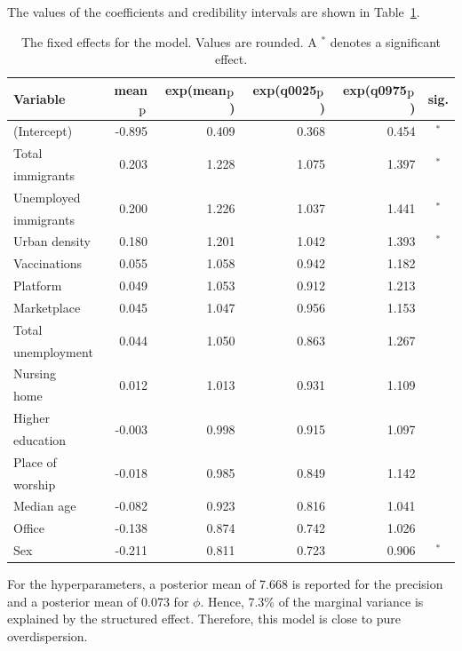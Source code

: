 \clearpage
The values of the coefficients and credibility intervals are shown in Table~\ref{fixedAllNorway_spatial}.
\begin{table}[H]
\caption{The fixed effects for the model. Values are rounded. A $^*$ denotes a significant effect. \label{fixedAllNorway_spatial}}
\begin{tabular}{l r r r r c}
\toprule
\textbf{Variable}	& \textbf{mean$_{\hbox{p}}$}	& \textbf{exp(mean$_{\hbox{p}}$)} & \textbf{exp(q0025$_{\hbox{p}}$)} & \textbf{exp(q0975$_{\hbox{p}}$)} & \textbf{sig.}\\
\midrule
(Intercept) & -0.895 & 0.409 & 0.368 & 0.454 & $^*$ \\
Total & \multirow{2}{*}{0.203}& \multirow{2}{*}{1.228}& \multirow{2}{*}{1.075}& \multirow{2}{*}{1.397}& \multirow{2}{*}{$^*$}\\
immigrants \\
Unemployed & \multirow{2}{*}{0.200} & \multirow{2}{*}{1.226} & \multirow{2}{*}{1.037} & \multirow{2}{*}{1.441} & \multirow{2}{*}{$^*$} \\
immigrants\\
Urban density & 0.180 & 1.201 & 1.042 & 1.393 & $^*$ \\
Vaccinations & 0.055 & 1.058 & 0.942 & 1.182\\
Platform & 0.049 & 1.053 & 0.912 & 1.213\\
Marketplace & 0.045 & 1.047 & 0.956 & 1.153 \\
Total & \multirow{2}{*}{0.044}& \multirow{2}{*}{1.050}& \multirow{2}{*}{0.863}& \multirow{2}{*}{1.267}\\
unemployment \\
Nursing & \multirow{2}{*}{0.012} & \multirow{2}{*}{1.013} & \multirow{2}{*}{0.931} & \multirow{2}{*}{1.109} \\
home\\
Higher & \multirow{2}{*}{-0.003}& \multirow{2}{*}{0.998}& \multirow{2}{*}{0.915}& \multirow{2}{*}{1.097}\\ 
education \\
Place of & \multirow{2}{*}{-0.018}& \multirow{2}{*}{0.985}& \multirow{2}{*}{0.849}& \multirow{2}{*}{1.142} \\
worship \\
Median age& -0.082 & 0.923 & 0.816 & 1.041 \\
Office & -0.138 & 0.874 & 0.742 & 1.026 \\
Sex & -0.211 & 0.811 & 0.723 & 0.906 & $^*$ \\
\bottomrule
\end{tabular}
\end{table}
For the hyperparameters, a posterior mean of 7.668 is reported for the precision and a posterior mean of 0.073 for $\phi$. Hence, 7.3\% of the marginal variance is explained by the structured effect. Therefore, this model is close to pure overdispersion.
\clearpage
